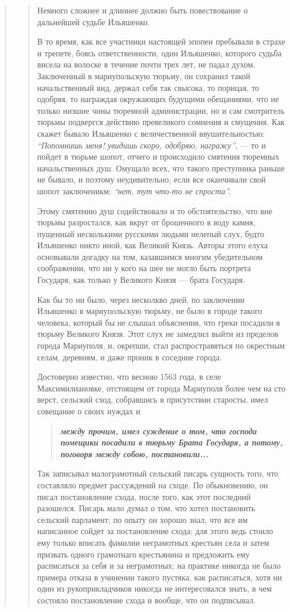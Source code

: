 \begin{quote}
\begin{quote}
Немного сложнее и длиннее должно быть повествование о дальнейшей судьбе Ильяшенко.

В то время, как все участники настоящей эпопеи
пребывали в страхе и трепете, боясь ответственности, один
Ильяшенко, которого судьба висела на волоске в течение
почти трех лет, не падал духом. Заключенный в мариупольскую тюрьму, он сохранил такой начальственный вид,
держал себя так свысока, то порицая, то одобряя,
то награждая окружающих будущими обещаниями, 
что не только низшие чины тюремной администрации, но и сам смотритель тюрьмы подвергся действию
превеликого сомнения и смущения. Как скажет бывало Ильяшенко 
с величественной ввушительностью: \emph{``Попомнишь меня! увидишь скоро,
одобряю, награжу''}, — то и пойдет в тюрьме шопот,
отчего и происходило смятения тюремных начальственных душ.
Омущало всех, что такого преступника раньше не
бывало, и поэтому неудивительно, если все оканчивали свой
шопот заключеникм: \emph{``нет, тут что-то не спроста''.}

Этому смятению душ содействовало и то обстоятельство, что вне тюрьмы
разростался, как вкруг от брошенного в воду камня, пущенный несколькими
русскими людьми нелепый слух, будто Ильяшенко никто иной, как Великий Князь.
Авторы этого елуха основывали догадку на том, казавшимся многим убедительном
соображении, что ни у кого на шее не могло быть портрета Государя, как только у
Великого Князя — брата Государя.

Как бы то ни было, через несколкво дней, по заключении Ильяшенко в
мариупольскую тюрьму, не было в городе такого человека, который бы не слышал
объяснения, что греки посадили в тюрьму Великого Князя. Этот слух не замедлил
выйти из пределов города Мариуполя, и, окрепши, стал распростравяться по
окрестным селам, деревням, и даже проник в соседние города.

Достоверно известно, что весною 1563 года, в селе Максимилиановке, отстоящем от
города Мариуполя более чем на сто верст, сельский сход, собравшись в
присутствии старосты, имел совещание о своих нуждах и 
\begin{quote}
\em\bfseries
между прочим, имел суждение о том, что господа помещики посадили в тюрьму Брата
Государя, а потому, поговоря между собою, постановили...
\end{quote}

Так записывал малограмотный сельский писарь сущность того, что составляло
предмет рассуждений на сходе. По обыкновению, он писал постановление схода,
после того, как этот последний разошелся. Писарь мало думал о том, что хотел
постановить сельский парламент; по опыту он хорошо знал, что все им написанное
сойдет за постановление схода; для этого ведь стоило ему только вписать фамилии
неграмотных крестьян села и затем призвать одного грамотнаго крестьянина и
предложить ему расписаться за себя и за неграмотных; на практике никогда не
было примера отказа в учинении такого пустяка, как расписаться, хотя ни один из
рукоприкладчиков никогда не интересовался знать, в чем состояло постановление
схода и вообще, что он подписывал.


\end{quote}
\end{quote}
